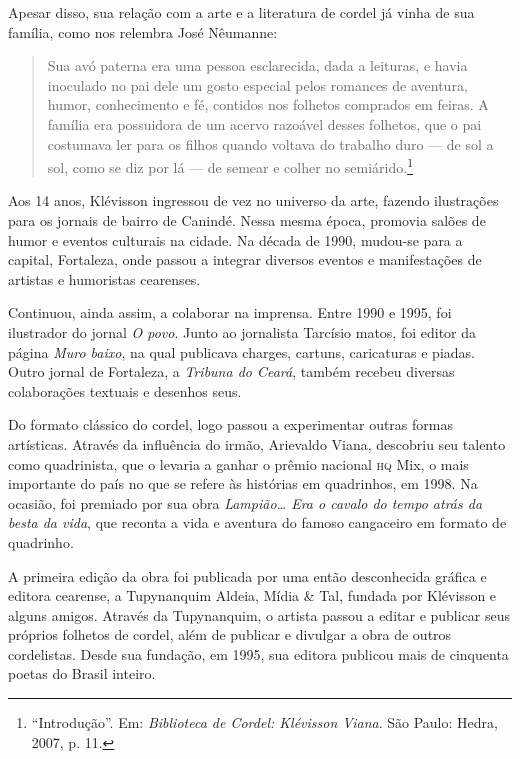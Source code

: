 \documentclass[11pt]{extarticle}
\begin{document}
Apesar disso, sua relação com a arte e a literatura de cordel já vinha de sua família, como nos relembra José Nêumanne:

\begin{quote}
Sua avó paterna era uma pessoa esclarecida, dada a leituras, e havia inoculado no pai dele um gosto especial pelos romances de aventura, humor, conhecimento e fé, contidos nos folhetos comprados em feiras. A família era possuidora de um acervo razoável desses folhetos, que o pai costumava ler para os filhos quando voltava do trabalho duro --- de sol a sol, como se diz por lá --- de semear e colher no semiárido.\footnote{``Introdução''. Em: \textit{Biblioteca de Cordel: Klévisson Viana}. São Paulo: Hedra, 2007, p. 11.}
\end{quote}

Aos 14 anos, Klévisson ingressou de vez no universo da arte, fazendo ilustrações para os jornais de bairro de Canindé. Nessa mesma época, promovia salões de humor e eventos culturais na cidade. Na década de 1990, mudou-se para a capital, Fortaleza, onde passou a integrar diversos eventos e manifestações de artistas e humoristas cearenses.

Continuou, ainda assim, a colaborar na imprensa. Entre 1990 e 1995, foi ilustrador do jornal \textit{O povo}. Junto ao jornalista Tarcísio matos, foi editor da página \textit{Muro baixo}, na qual publicava charges, cartuns, caricaturas e piadas. Outro jornal de Fortaleza, a
\textit{Tribuna do Ceará}, também recebeu diversas colaborações textuais e desenhos seus.

Do formato clássico do cordel, logo passou a experimentar outras formas artísticas. Através da influência do irmão, Arievaldo Viana, descobriu seu talento como quadrinista, que o levaria a ganhar o prêmio nacional \textsc{hq} Mix, o mais importante do país no que se refere às histórias em quadrinhos, em 1998. Na ocasião, foi premiado por sua obra \textit{Lampião\ldots{} Era o cavalo do tempo atrás da besta da vida}, que reconta a vida e aventura do famoso cangaceiro em formato de quadrinho.

A primeira edição da obra foi publicada por uma então desconhecida gráfica e editora cearense, a Tupynanquim Aldeia, Mídia \& Tal, fundada por Klévisson e alguns amigos. Através da Tupynanquim, o artista passou a editar e publicar seus próprios folhetos de cordel, além de publicar e divulgar a obra de outros cordelistas. Desde sua fundação, em 1995, sua editora publicou mais de cinquenta poetas do Brasil inteiro.
\end{document}
